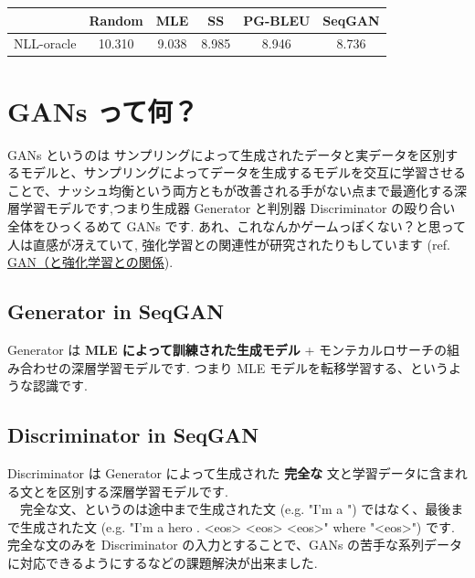 \documentclass[a4paper, dvipdfmx, 10pt]{article}
\begin{document}
\begin{center}
\begin{tabular}{c|c|c|c|c|c}
 & Random & MLE & SS & PG-BLEU & SeqGAN\\
\hline
NLL-oracle & 10.310 & 9.038 & 8.985 & 8.946 & 8.736\\
\end{tabular}

\end{center}

\section{GANs って何？}
\label{sec:org4e62e66}
GANs というのは サンプリングによって生成されたデータと実データを区別するモデルと、サンプリングによってデータを生成するモデルを交互に学習させることで、ナッシュ均衡という両方ともが改善される手がない点まで最適化する深層学習モデルです,つまり生成器 Generator と判別器 Discriminator の殴り合い全体をひっくるめて GANs です. あれ、これなんかゲームっぽくない？と思って人は直感が冴えていて, 強化学習との関連性が研究されたりもしています (ref. \href{https://www.slideshare.net/masa\_s/gan-83975514}{GAN（と強化学習との関係}). \\
\subsection{Generator in SeqGAN}
\label{sec:orgae2bde4}
Generator は \textbf{MLE によって訓練された生成モデル} + モンテカルロサーチの組み合わせの深層学習モデルです. つまり MLE モデルを転移学習する、というような認識です.
\subsection{Discriminator in SeqGAN}
\label{sec:orge3f9585}
 Discriminator は Generator によって生成された \textbf{完全な} 文と学習データに含まれる文とを区別する深層学習モデルです.\\
　完全な文、というのは途中まで生成された文 (e.g. "I'm a ") ではなく、最後まで生成された文 (e.g. "I'm a hero . <eos> <eos> <eos>" where "<eos>") です. 完全な文のみを Discriminator の入力とすることで、GANs の苦手な系列データに対応できるようにするなどの課題解決が出来ました.
\end{document}
